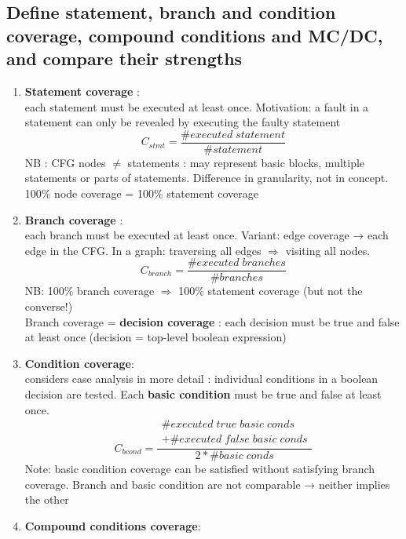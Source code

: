 \documentclass{article}
\begin{document}
\subsection{Define statement, branch and condition coverage, compound conditions and MC/DC, and compare their strengths}
\vspace{-0.5cm}
\begin{multicols}{2}
\begin{enumerate}
    \item \textbf{Statement coverage} : \\ 
    each statement must be executed at least once. Motivation: a fault in a statement can only be revealed by executing the faulty statement 
    $$C_{stmt} = \frac{\#executed\;statement}{\#statement}$$
    NB : CFG nodes $\neq$ statements : may represent basic blocks, multiple statements or parts of statements. Difference in granularity, not in concept. 100\% node coverage = 100\% statement coverage\\
    \item \textbf{Branch coverage} :\\ each branch must be executed at least once. Variant: edge coverage → each edge in the CFG. In a graph: traversing all edges $\Rightarrow$ visiting all nodes.
    $$C_{branch} = \frac{\#executed\;branches}{\#branches}$$
    NB: 100\% branch coverage $\Rightarrow$ 100\% statement coverage (but not the converse!)\\
    Branch coverage = \textbf{decision coverage} : each decision must be true and false at least once (decision =
    top-level boolean expression)\\
    \item \textbf{Condition coverage}:\\ 
    considers case analysis in more detail : individual conditions in a boolean decision are tested. Each \textbf{basic condition} must be true and false at least once.
$$C_{bcond} = \frac{
\begin{gathered}
\#executed\;true\;basic\;conds\\
+\#executed\;false\;basic\;conds
\end{gathered}
}{2*\#basic\;conds}$$
    Note: basic condition coverage can be satisfied without satisfying branch
coverage. Branch and basic condition are not comparable → neither implies the other\\
    \item \textbf{Compound conditions coverage}:\\ 

\end{enumerate}
\end{multicols}
\end{document}
